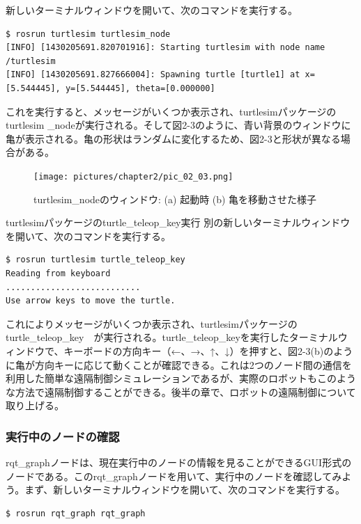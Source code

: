 新しいターミナルウィンドウを開いて、次のコマンドを実行する。

\begin{lstlisting}[language=ROS]
$ rosrun turtlesim turtlesim_node
[INFO] [1430205691.820701916]: Starting turtlesim with node name /turtlesim
[INFO] [1430205691.827666004]: Spawning turtle [turtle1] at x=[5.544445], y=[5.544445], theta=[0.000000]
\end{lstlisting}

これを実行すると、メッセージがいくつか表示され、turtlesimパッケージのturtlesim \_nodeが実行される。そして図2-3のように、青い背景のウィンドウに亀が表示される。亀の形状はランダムに変化するため、図2-3と形状が異なる場合がある。

\begin{figure}[h]
  \centering
  \texttt{[image: pictures/chapter2/pic\_02\_03.png]}
  \caption{turtlesim\_nodeのウィンドウ: (a) 起動時 (b) 亀を移動させた様子}
\end{figure}

turtlesimパッケージのturtle\_teleop\_key実行
別の新しいターミナルウィンドウを開いて、次のコマンドを実行する。

\begin{lstlisting}[language=ROS]
$ rosrun turtlesim turtle_teleop_key
Reading from keyboard
...........................
Use arrow keys to move the turtle.
\end{lstlisting}

これによりメッセージがいくつか表示され、turtlesimパッケージのturtle\_teleop\_key　が実行される。turtle\_teleop\_keyを実行したターミナルウィンドウで、キーボードの方向キー（←、→、↑、↓）を押すと、図2-3(b)のように亀が方向キーに応じて動くことが確認できる。これは2つのノード間の通信を利用した簡単な遠隔制御シミュレーションであるが、実際のロボットもこのような方法で遠隔制御することができる。後半の章で、ロボットの遠隔制御について取り上げる。

\subsubsection{実行中のノードの確認}

rqt\_graphノードは、現在実行中のノードの情報を見ることができるGUI形式のノードである。このrqt\_graphノードを用いて、実行中のノードを確認してみよう。まず、新しいターミナルウィンドウを開いて、次のコマンドを実行する。

\begin{lstlisting}[language=ROS]
$ rosrun rqt_graph rqt_graph
\end{lstlisting}

